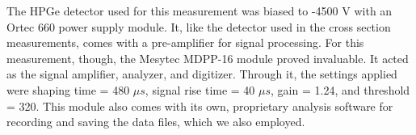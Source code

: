 The HPGe detector used for this measurement was biased to -4500 V with an Ortec 660 power supply module. It, like the detector used in the cross section measurements, comes with a pre-amplifier for signal processing. For this measurement, though, the Mesytec MDPP-16 module proved invaluable. It acted as the signal amplifier, analyzer, and digitizer. Through it, the settings applied were shaping time = 480 $\mu s$, signal rise time = 40 $\mu s$, gain = 1.24, and threshold = 320. This module also comes with its own, proprietary analysis software for recording and saving the data files, which we also employed.





%
% 
% 





